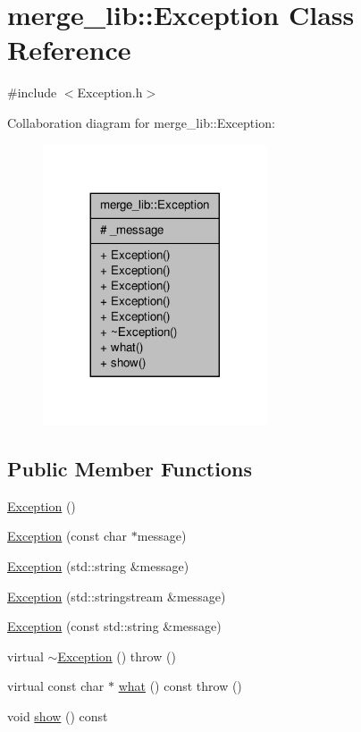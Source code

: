 \hypertarget{classmerge__lib_1_1_exception}{\section{merge\-\_\-lib\-:\-:Exception Class Reference}
\label{d7/d2b/classmerge__lib_1_1_exception}
}


{\ttfamily \#include $<$Exception.\-h$>$}



Collaboration diagram for merge\-\_\-lib\-:\-:Exception\-:
\nopagebreak
\begin{figure}[H]
\begin{center}
\leavevmode
\includegraphics[width=188pt]{d9/d00/classmerge__lib_1_1_exception__coll__graph}
\end{center}
\end{figure}
\subsection*{Public Member Functions}
\begin{DoxyCompactItemize}
\item 
\hyperlink{classmerge__lib_1_1_exception_a02d25f4b7107fb7b39b33334d68ec0a0}{Exception} ()
\item 
\hyperlink{classmerge__lib_1_1_exception_abfb957059ea8071bb063adcf048dba9d}{Exception} (const char $\ast$message)
\item 
\hyperlink{classmerge__lib_1_1_exception_a8673a743c4e3c928238eab5bc8375d85}{Exception} (std\-::string \&message)
\item 
\hyperlink{classmerge__lib_1_1_exception_a7b974aadeb56bd14b1f9361d9b21baab}{Exception} (std\-::stringstream \&message)
\item 
\hyperlink{classmerge__lib_1_1_exception_ae674f9182cba6adce85e6e8b8f2c6be7}{Exception} (const std\-::string \&message)
\item 
virtual \hyperlink{classmerge__lib_1_1_exception_ad2354abcefda7a2f1d33311feb5b9386}{$\sim$\-Exception} ()  throw ()
\item 
virtual const char $\ast$ \hyperlink{classmerge__lib_1_1_exception_ae9118923f240ca36a10e2536362819e1}{what} () const   throw ()
\item 
void \hyperlink{classmerge__lib_1_1_exception_a3969e6753987ebe480567595117e3966}{show} () const 
\end{DoxyCompactItemize}
